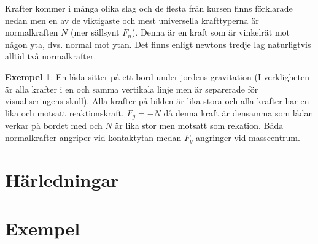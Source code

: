 \documentclass[12pt, a4paper]{article}
\theoremstyle{definition}
\newtheorem{exm}{Exempel}
\begin{document}
    Krafter kommer i många olika slag och de flesta från kursen finns förklarade nedan men en av de viktigaste och mest universella krafttyperna är normalkraften $N$ (mer sällsynt $F_n$). Denna är en kraft som är vinkelrät mot någon yta, dvs. normal mot ytan. Det finns enligt newtons tredje lag naturligtvis alltid två normalkrafter.
    \begin{exm}
        En låda sitter på ett bord under jordens gravitation (I verkligheten är alla krafter i en och samma vertikala linje men är separerade för visualiseringens skull). Alla krafter på bilden är lika stora och alla krafter har en lika och motsatt reaktionskraft. $F_g = -N$ då denna kraft är densamma som lådan verkar på bordet med och $N$ är lika stor men motsatt som rekation. Båda normalkrafter angriper vid kontaktytan medan $F_g$ angringer vid masscentrum.
        \begin{center}
        \end{center}
    \end{exm}

    

    \newpage
    \appendix
    \section{Härledningar}
    \label{appendix:härledning}
    
    \section{Exempel}
    \label{appendix:exempel}
\end{document}
